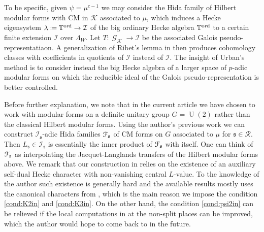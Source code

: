 \documentclass[leqno]{amsart}
\theoremstyle{definition}
\theoremstyle{remark}
\DeclareMathOperator{\UU}{U}
\DeclareMathOperator{\Gal}{\mathcal{G}}
\newcommand{\fs}{\mathfrak{s}}
\newcommand{\K}{{\mathcal{K}}} %
\newcommand{\TT}{\mathbb{T}} %
\newcommand{\euF}{\EuScript{F}} %
\newcommand{\I}{\mathcal{I}} %
\newcommand{\ord}{\textnormal{ord}} %
\begin{document}
To be specific,
given $\psi=\mu^{c-1}$ we may 
consider the Hida family of Hilbert modular forms
with CM in $\K$ associated to $\mu$,
which induces a Hecke eigensystem
$\lambda\coloneqq \TT^{\ord}\to \I$
of the big ordinary Hecke algebra $\TT^{\ord}$
to a certain finite extension $\I$ over $\Lambda_W$.
Let $T\colon \Gal_\K\to \I$ be the associated 
Galois pseudo-representatiaon.
A generalization of Ribet's lemma in \cite{Ribet1976}
then produces cohomology classes
with coefficients in quotients of $\I$ instead of $\I$.
The insight of Urban's method is to consider instead
the big Hecke algebra of a larger space of $p$-adic modular forms
on which the reducible ideal of 
the Galois pseudo-representation is better controlled.

Before further explanation,
we note that in the current article 
we have chosen to work with 
modular forms on a definite unitary group $G=\UU(2)$
rather than the classical Hilbert modular forms.
Using the author's previous work \cite{lee}
we can construct $\I_\fs$-adic Hida families $\euF_\fs$
of CM forms on $G$ associated to $\mu$ for $\fs\in\mathcal{R}$.
Then $L_\fs\in \I_\fs$ is essentially the inner product 
of $\euF_\fs$ with itself.
One can think of $\euF_\fs$ as interpolating the Jacquet-Langlands
transfers of the Hilbert modular forms above.
We remark that our construction in \cite{lee}
relies on the existence of an auxiliary self-dual 
Hecke character with non-vanishing central $L$-value.
To the knowledge of the author such existence is generally hard
and the available results mostly uses the canonical characters
from \cite{Rohrlich}, which is the main reason
we impose the condition \ref{cond:K2in} and \ref{cond:K3in}.
On the other hand, the condition \ref{cond:psi2in} 
can be relieved if the local computations in \cite{lee}
at the non-split places can be improved,
which the author would hope to come back to in the future.
\end{document}
